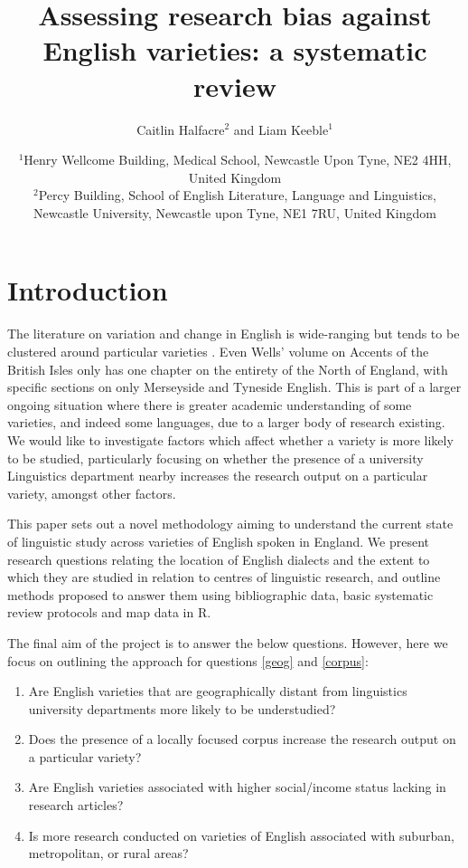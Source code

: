 \documentclass[review]{article}
\title{Assessing research bias against English varieties: a systematic review}
\author{Caitlin Halfacre$^{2}$ and Liam Keeble$^{1}$}
\date{$^{1}$Henry Wellcome Building, Medical School, Newcastle Upon Tyne, NE2 4HH, United Kingdom\\
$^{2}$Percy Building, School of English Literature, Language and Linguistics, Newcastle University, Newcastle upon Tyne, NE1 7RU, United Kingdom\\}
\begin{document}
\maketitle







\newpage


\linenumbers

\section{Introduction}


The literature on variation and change in English is wide-ranging but tends to be clustered around particular varieties \cite{Trudgill2002}. Even Wells' \cite{Wells1982b} volume on Accents of the British Isles only has one chapter on the entirety of the North of England, with specific sections on only Merseyside and Tyneside English. This is part of a larger ongoing situation where there is greater academic understanding of some varieties, and indeed some languages, due to a larger body of research existing. We would like to investigate factors which affect whether a variety is more likely to be studied, particularly focusing on whether the presence of a university Linguistics department nearby increases the research output on a particular variety, amongst other factors.
	
	This paper sets out a novel methodology aiming to understand the current state of linguistic study across varieties of English spoken in England. We present research questions relating the location of English dialects and the extent to which they are studied in relation to centres of linguistic research, and outline methods proposed to answer them using bibliographic data, basic systematic review protocols and map data in R. 
	
	The final aim of the project is to answer the below questions. However, here we focus on outlining the approach for questions \ref{geog} and \ref{corpus}:
	\begin{enumerate} 
		\item Are English varieties that are geographically distant from linguistics university departments more likely to be understudied? \label{geog}
		
		\item Does the presence of a locally focused corpus increase the research output on a particular variety?  \label{corpus}
		
		\item Are English varieties associated with higher social/income status lacking in research articles? \label{income}
		
		\item Is more research conducted on varieties of English associated with suburban, metropolitan, or rural areas? \label{suburban}
	\end{enumerate}
	
\end{document}
